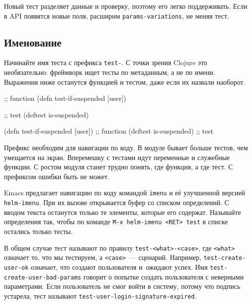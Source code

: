\fi

Новый тест разделяет данные и проверку, поэтому его легко поддерживать. Если в
API появятся новые поля, расширим \verb|params-variations|, не меняя тест.

\subsection{Именование}

Начинайте имя теста с префикса \verb|test-|. С точки зрения Clojure это
необязательно: фреймворк ищет тесты по метаданным, а не по имени. Выражения ниже
останутся функцией и тестом, даже если их назвали наоборот.

\ifx\DEVICETYPE\MOBILE

\begin{english}
  \begin{clojure}
;; function
(defn test-if-suspended [user])

;; test
(deftest is-suspended)
  \end{clojure}
\end{english}

\else

\begin{english}
  \begin{clojure}
(defn test-if-suspended [user]) ;; function
(deftest is-suspended)          ;; test
  \end{clojure}
\end{english}

\fi

Префикс необходим для навигации по коду. В модуле бывает больше тестов, чем
умещается на экран. Вперемешку с тестами идут переменные и служебные функции. С
ростом модуля станет трудно понять, где функция, а где тест. С префиксом ошибки
быть не может.


\mnoindent
Emacs предлагает навигацию по коду командой \verb|imenu| и её улучшенной
версией \verb|helm-imenu|. При их вызове открывается буфер со списком
определений. С вводом текста останутся только те элементы, которые его
содержат. Называйте определения так, чтобы по команде \verb|M-x helm-imenu <RET> test|
в списке остались только тесты.

В общем случае тест называют по правилу \verb|test-<what>-<case>|, где
\verb|<what>| означает то, что мы тестируем, а \verb|<case>|~--- сценарий. Например,
\verb|test-create-user-ok| означает, что создают пользователя и~ожидают
успех. Имя \verb|test-create-user-bad-params| говорит о попытке создать
пользователя с неверными параметрами. Если пользователь не смог войти в систему,
потому что подпись устарела, тест называют
\verb|test-user-login-signature-expired|.

